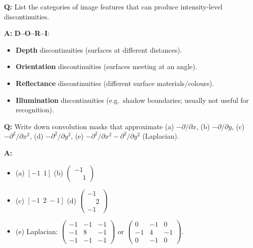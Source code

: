 \begin{exbox}
\textbf{Q:} List the categories of image features that can produce intensity-level discontinuities.

\textbf{A:} \textbf{D--O--R--I}:
\begin{itemize}
  \item \textbf{Depth} discontinuities (surfaces at different distances).
  \item \textbf{Orientation} discontinuities (surfaces meeting at an angle).
  \item \textbf{Reflectance} discontinuities (different surface materials/colours).
  \item \textbf{Illumination} discontinuities (e.g.\ shadow boundaries; usually not useful for recognition).
\end{itemize}
\end{exbox}

\begin{exbox}
\textbf{Q:} Write down convolution masks that approximate (a) $-\partial/\partial x$, (b) $-\partial/\partial y$, (c) $-\partial^2/\partial x^2$, (d) $-\partial^2/\partial y^2$, (e) $-\partial^2/\partial x^2 - \partial^2/\partial y^2$ (Laplacian).

\textbf{A:}
\begin{itemize}
  \item (a) $[-1\ \ 1]$ \quad (b) $\begin{pmatrix} -1 \\ \phantom{-}1 \end{pmatrix}$
  \item (c) $[-1\ \ 2\ -1]$ \quad (d) $\begin{pmatrix} -1 \\ \phantom{-}2 \\ -1 \end{pmatrix}$
  \item (e) Laplacian: $\begin{pmatrix} -1 & -1 & -1 \\ -1 & 8 & -1 \\ -1 & -1 & -1 \end{pmatrix}$ or $\begin{pmatrix} 0 & -1 & 0 \\ -1 & 4 & -1 \\ 0 & -1 & 0 \end{pmatrix}$.
\end{itemize}
\end{exbox}

